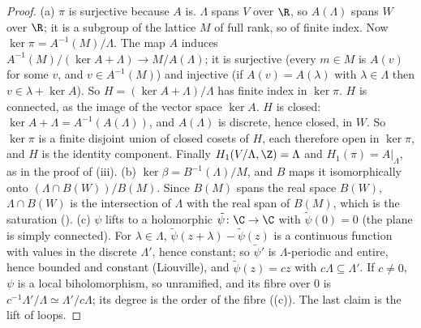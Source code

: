 \begin{proof}
(a) $\pi$ is surjective because $A$ is. $\Lambda$ spans $V$ over $\R$, so $A(\Lambda)$ spans $W$ over $\R$; it is a subgroup of the lattice $M$ of full rank, so of finite index. Now
$\ker\pi=A^{-1}(M)/\Lambda$. The map $A$ induces $A^{-1}(M)/(\ker A+\Lambda)\to M/A(\Lambda)$; it is surjective (every $m\in M$ is $A(v)$ for some $v$, and $v\in A^{-1}(M)$) and injective
(if $A(v)=A(\lambda)$ with $\lambda\in\Lambda$ then $v\in\lambda+\ker A$). So $H=(\ker A+\Lambda)/\Lambda$ has finite index in $\ker\pi$. $H$ is connected, as the image of the vector space
$\ker A$. $H$ is closed: $\ker A+\Lambda=A^{-1}(A(\Lambda))$, and $A(\Lambda)$ is discrete, hence closed, in $W$. So $\ker\pi$ is a finite disjoint union of closed cosets of $H$, each
therefore open in $\ker\pi$, and $H$ is the identity component. Finally $H_1(V/\Lambda,\Z)=\Lambda$ and $H_1(\pi)=A|_\Lambda$, as in the proof of (iii).
(b) $\ker\beta=B^{-1}(\Lambda)/M$, and $B$ maps it isomorphically onto $(\Lambda\cap B(W))/B(M)$. Since $B(M)$ spans the real space $B(W)$, $\Lambda\cap B(W)$ is the intersection of $\Lambda$ with the
real span of $B(M)$, which is the saturation ().
(c) $\psi$ lifts to a holomorphic $\tilde\psi\colon\C\to\C$ with $\tilde\psi(0)=0$ (the plane is simply connected). For $\lambda\in\Lambda$, $\tilde\psi(z+\lambda)-\tilde\psi(z)$ is a continuous
function with values in the discrete $\Lambda'$, hence constant; so $\tilde\psi'$ is $\Lambda$-periodic and entire, hence bounded and constant (Liouville), and $\tilde\psi(z)=cz$ with
$c\Lambda\subseteq\Lambda'$. If $c\ne0$, $\psi$ is a local biholomorphism, so unramified, and its fibre over $0$ is $c^{-1}\Lambda'/\Lambda\simeq\Lambda'/c\Lambda$; its degree is the order of the
fibre ((c)). The last claim is the lift of loops.
\end{proof}

